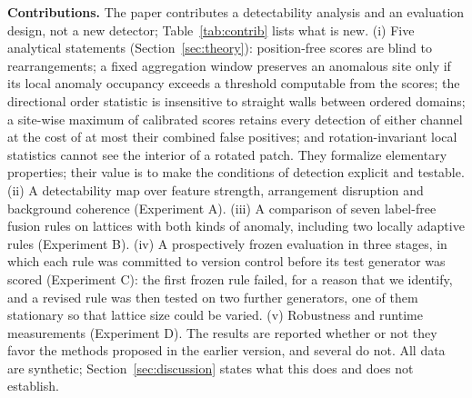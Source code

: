 \documentclass[preprint,review,12pt]{elsarticle}
\begin{document}
\textbf{Contributions.} The paper contributes a detectability analysis and an evaluation design, not a new detector; Table~\ref{tab:contrib} lists what is new. (i) Five analytical statements (Section~\ref{sec:theory}): position-free scores are blind to rearrangements; a fixed aggregation window preserves an anomalous site only if its local anomaly occupancy exceeds a threshold computable from the scores; the directional order statistic is insensitive to straight walls between ordered domains; a site-wise maximum of calibrated scores retains every detection of either channel at the cost of at most their combined false positives; and rotation-invariant local statistics cannot see the interior of a rotated patch. They formalize elementary properties; their value is to make the conditions of detection explicit and testable. (ii) A detectability map over feature strength, arrangement disruption and background coherence (Experiment A). (iii) A comparison of seven label-free fusion rules on lattices with both kinds of anomaly, including two locally adaptive rules (Experiment B). (iv) A prospectively frozen evaluation in three stages, in which each rule was committed to version control before its test generator was scored (Experiment C): the first frozen rule failed, for a reason that we identify, and a revised rule was then tested on two further generators, one of them stationary so that lattice size could be varied. (v) Robustness and runtime measurements (Experiment D). The results are reported whether or not they favor the methods proposed in the earlier version, and several do not. All data are synthetic; Section~\ref{sec:discussion} states what this does and does not establish.

\begin{table}[t]
\caption{What is new in this study.}
\label{tab:contrib}
\centering\small
{}
\end{table}
\end{document}
